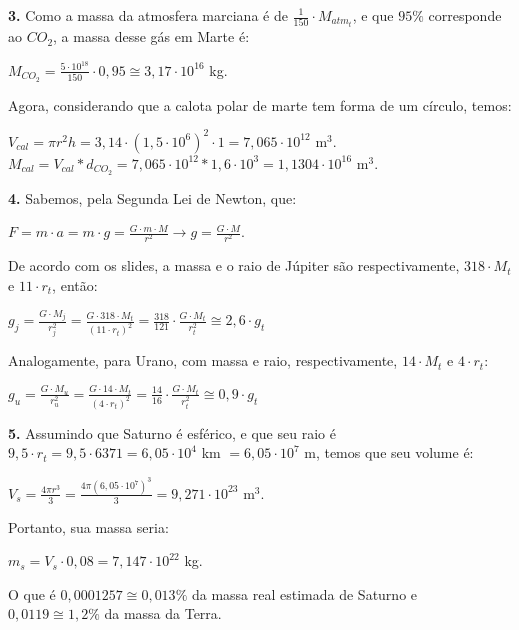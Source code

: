 \documentclass[12pt,letterpaper]{article}
\begin{document}
	    \textbf{3.} Como a massa da atmosfera marciana é de 
	    $\frac{1}{150} \cdot M_{atm_t}$, e que $95\%$ corresponde ao $CO_2$, a massa desse gás em Marte é:\\
	    \begin{center}
	    $M_{CO_2} = \frac{5\cdot10^{18}}{150} \cdot 0,95 \cong 3,17 \cdot 10^{16}$ kg. 
	    \end{center}
	    Agora, considerando que a calota polar de marte tem forma de um círculo, temos: 
	    \begin{center}
	    $V_{cal} = \pi r^2h = 3,14 \cdot (1,5 \cdot 10^{6})^2 \cdot 1 = 7,065 \cdot 10^{12}$ m$^3$. \\
	    $M_{cal} = V_{cal} * d_{CO_2} = 7,065 \cdot 10^{12} * 1,6 \cdot 10^3 = 1,1304 \cdot 10^{16}$ m$^3$. 
	    \end{center}
	    
	    \textbf{4.} Sabemos, pela Segunda Lei de Newton, que:\\
	    \begin{center}
	    $ F = m\cdot a = m\cdot g = \frac{G\cdot m \cdot M}{r^2} \to g = \frac{G\cdot M}{r^2}$.\\
	    \end{center}
	    De acordo com os slides, a massa e o raio de Júpiter são respectivamente, $318 \cdot M_t$ e $11 \cdot r_t$, então: \\
	    \begin{center}
	    $g_j = \frac{G\cdot M_j}{r_j^2} = \frac{G\cdot 318 \cdot M_t}{(11 \cdot r_t)^2} = \frac{318}{121} \cdot \frac{G\cdot M_t}{r_t^2} \cong 2,6 \cdot g_t$
	    \end{center} 
	    Analogamente, para Urano, com massa e raio, respectivamente, $14 \cdot M_t$ e $4 \cdot r_t$:
	    \begin{center}
	    $g_u = \frac{G\cdot M_u}{r_u^2} = \frac{G\cdot 14 \cdot M_t}{(4 \cdot r_t)^2} = \frac{14}{16} \cdot \frac{G\cdot M_t}{r_t^2} \cong 0,9 \cdot g_t$
	    \end{center}
	    \textbf {5.} Assumindo que Saturno é esférico, e que seu raio é $9,5 \cdot r_t = 9,5 \cdot 6371 = 6,05 \cdot 10^4$ km $ = 6,05 \cdot 10^7$ m, temos que seu volume é:
	    \begin{center}
	    	$V_s = \frac{4 \pi r^3}{3} = \frac{4 \pi (6,05 \cdot 10^7)^3}{3} = 9,271 \cdot 10^{23}$ m$^3$.
	    \end{center}
	    Portanto, sua massa seria:
	    \begin{center}
	    	$m_s = V_s \cdot 0,08 = 7,147 \cdot 10^{22}$ kg.
	    \end{center}
	    O que é $0,0001257 \cong 0,013\%$ da massa real estimada de Saturno e $0,0119 \cong 1,2\%$ da massa da Terra. \\
	    
\end{document}
